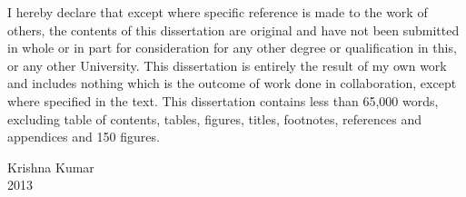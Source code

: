 
\begin{declaration} %

I hereby declare that except where specific reference is made to the work of others, the contents of this dissertation are original and have not been submitted in whole or in part for consideration for any other degree or qualification in this, or any other University. This dissertation is entirely the result of my own work and includes nothing which is the outcome of work done in collaboration, except where specified in the text. This dissertation contains less than 65,000 words, excluding table of contents, tables, figures, titles, footnotes, references and appendices and 150 figures.

\flushright

Krishna Kumar\\
2013
\end{declaration}

